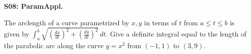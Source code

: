 \documentclass[12pt]{article}
\newcommand{\<}{\left\langle}
\renewcommand{\>}{\right\rangle}
\newcommand{\exerciseHeader}[4]{


  \vspace{0.5em}
  \textbf{#2}
  \vspace{0.5em}

}
\begin{document}
\begin{multicols}{2}
%

\exerciseHeader{2017 June 30}{S08: ParamAppl.}{
Parametrize a curve to find arclengths, surface areas, and slopes.
}{2/3}

The arclength of a curve parametrized by \(x,y\) in terms of \(t\)
from \(a\leq t\leq b\) is given by
\(\int_a^b\sqrt{(\frac{dx}{dt})^2+(\frac{dy}{dt})^2}\,dt\).
Give a definite integral equal to the length of the parabolic arc along the
curve \(y=x^2\) from \((-1,1)\) to \((3,9)\).



%

%

%

%

%

%


\end{multicols}
\end{document}
